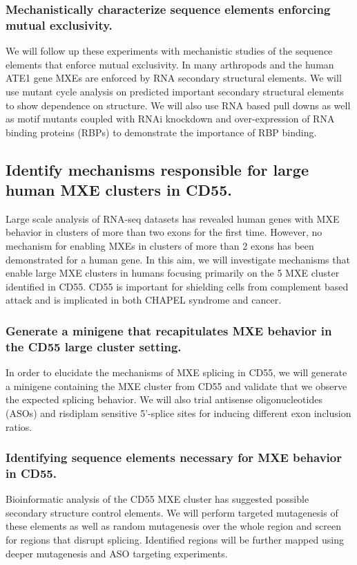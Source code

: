 \documentclass{article}
\begin{document}
\subsubsection{Mechanistically characterize sequence elements enforcing mutual exclusivity.} 
We will follow up these experiments with mechanistic studies of the sequence elements that enforce mutual exclusivity. 
In many arthropods and the human ATE1 gene \cite{Graveley2005-oi, Jin2018-tq, Kalinina2021-jt} MXEs are enforced by RNA secondary structural elements. 
We will use mutant cycle analysis on predicted important secondary structural elements to show dependence on structure. 
We will also use RNA based pull downs as well as motif mutants coupled with RNAi knockdown and over-expression of RNA binding proteins (RBPs) to demonstrate the importance of RBP binding. 
%
\subsection{Identify mechanisms responsible for large human MXE clusters in CD55.}
Large scale analysis of RNA-seq datasets has revealed human genes with MXE behavior in clusters of more than two exons for the first time.\cite{Hatje2017-oj} 
However, no mechanism for enabling MXEs in clusters of more than 2 exons has been demonstrated for a human gene. 
In this aim, we will investigate mechanisms that enable large MXE clusters in humans focusing primarily on the 5 MXE cluster identified in CD55. 
CD55 is important for shielding cells from complement based attack and is implicated in both CHAPEL syndrome and cancer.\cite{Bharti2022-oz,Stallard2023-ll}
%
\subsubsection{Generate a minigene that recapitulates MXE behavior in the CD55 large cluster setting.}  
In order to elucidate the mechanisms of MXE splicing in CD55, we will generate a minigene containing the MXE cluster from CD55 and validate that we observe the expected splicing behavior. 
We will also trial antisense oligonucleotides (ASOs) and risdiplam sensitive 5'-splice sites for inducing different exon inclusion ratios.
%
\subsubsection{Identifying sequence elements necessary for MXE behavior in CD55.} 
Bioinformatic analysis of the CD55 MXE cluster has suggested possible secondary structure control elements.\Cite{Hatje2017-oj} 
We will perform targeted mutagenesis of these elements as well as random mutagenesis over the whole region and screen for regions that disrupt splicing. 
Identified regions will be further mapped using deeper mutagenesis and ASO targeting experiments.
%
\end{document}
